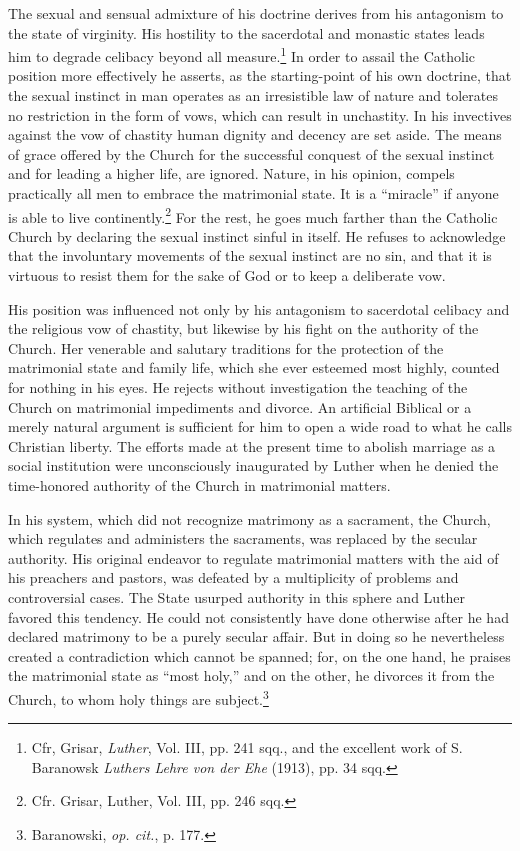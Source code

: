The sexual and sensual admixture of his doctrine derives from his
antagonism to the state of virginity. His hostility to the sacerdotal
and monastic states leads him to degrade celibacy beyond all measure.\footnote
{Cfr, Grisar, \textit{Luther}, Vol. III, pp. 241 sqq., and the excellent work of S. Baranowsk
\textit{Luthers Lehre von der Ehe} (1913), pp. 34 sqq.}
In order to assail the Catholic position more effectively he asserts,
as the starting-point of his own doctrine, that the sexual instinct in
man operates as an irresistible law of nature and tolerates no
restriction in the form of vows, which can result in unchastity. In
his invectives against the vow of chastity human dignity and decency are
set aside. The means of grace offered by the Church for the
successful conquest of the sexual instinct and for leading a higher life,
are ignored. Nature, in his opinion, compels practically all men to
embrace the matrimonial state. It is a “miracle” if anyone is able to
live continently.\footnote{Cfr. Grisar, Luther, Vol. III, pp. 246 sqq.}
For the rest, he goes much farther than the
Catholic Church by declaring the sexual instinct sinful in itself. He
refuses to acknowledge that the involuntary movements of the sexual
instinct are no sin, and that it is virtuous to resist them for the sake
of God or to keep a deliberate vow.

His position was influenced not only by his antagonism to sacerdotal
celibacy and the religious vow of chastity, but likewise by his
fight on the authority of the Church. Her venerable and salutary
traditions for the protection of the matrimonial state and family life,
which she ever esteemed most highly, counted for nothing in his
eyes. He rejects without investigation the teaching of the Church
on matrimonial impediments and divorce. An artificial Biblical or a
merely natural argument is sufficient for him to open a wide road to
what he calls Christian liberty. The efforts made at the present time
to abolish marriage as a social institution were unconsciously inaugurated
by Luther when he denied the time-honored authority
of the Church in matrimonial matters.

In his system, which did not recognize matrimony as a sacrament,
the Church, which regulates and administers the sacraments, was replaced
by the secular authority. His original endeavor to regulate
matrimonial matters with the aid of his preachers and pastors, was
defeated by a multiplicity of problems and controversial cases. The
State usurped authority in this sphere and Luther favored this tendency.
He could not consistently have done otherwise after he had
declared matrimony to be a purely secular affair. But in doing so he
nevertheless created a contradiction which cannot be spanned; for,
on the one hand, he praises the matrimonial state as “most holy,” and
on the other, he divorces it from the Church, to whom holy things
are subject.\footnote{Baranowski, \textit{op. cit.}, p. 177.}

